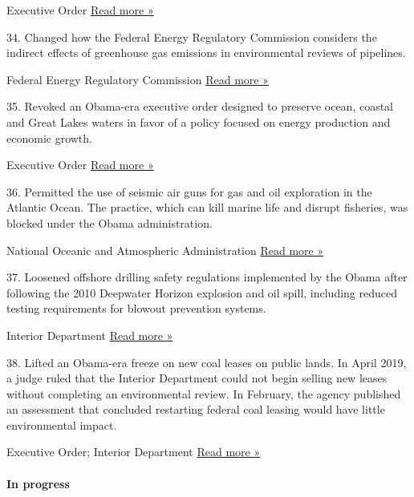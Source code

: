  Executive Order \textbar{}
\href{https://eelp.law.harvard.edu/2019/04/energy-eos-in-depth-new-presidential-permit-for-keystone-xl-and-changes-to-presidential-permitting/}{Read
more »}

34. Changed how the Federal Energy Regulatory Commission considers the
indirect effects of greenhouse gas emissions in environmental reviews of
pipelines.

 Federal Energy Regulatory Commission \textbar{}
\href{https://www.eenews.net/eenewspm/stories/1060082141}{Read more »}

35. Revoked an Obama-era executive order designed to preserve ocean,
coastal and Great Lakes waters in favor of a policy focused on energy
production and economic growth.

 Executive Order \textbar{}
\href{https://www.apnews.com/57d405229ba844f59f9f2d06c65c4318}{Read more
»}

36. Permitted the use of seismic air guns for gas and oil exploration in
the Atlantic Ocean. The practice, which can kill marine life and disrupt
fisheries, was blocked under the Obama administration.

 National Oceanic and Atmospheric Administration \textbar{}
\href{https://apnews.com/3bd02acc43aa4cecada19d87d20edd31}{Read more »}

37. Loosened offshore drilling safety regulations implemented by the
Obama after following the 2010 Deepwater Horizon explosion and oil
spill, including reduced testing requirements for blowout prevention
systems.

 Interior Department \textbar{}
\href{https://www.nytimes3xbfgragh.onion/2019/05/02/climate/offshore-drilling-safety-rollback-deepwater-horizon.html}{Read
more »}

38. Lifted an Obama-era freeze on new coal leases on public lands. In
April 2019, a judge ruled that the Interior Department could not begin
selling new leases without completing an environmental review. In
February, the agency published an assessment that concluded restarting
federal coal leasing would have little environmental impact.

 Executive Order; Interior Department \textbar{}
\href{https://www.nytimes3xbfgragh.onion/2019/04/19/climate/court-trump-coal-mining-setback.html}{Read
more »}

\hypertarget{in-progress-1}{%
\paragraph{In progress}\label{in-progress-1}}

